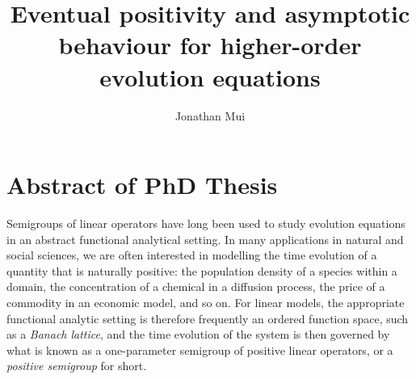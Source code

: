\documentclass{baustms}
\theoremstyle{cupthm}
\theoremstyle{cupdefn}
\theoremstyle{cuprem}
\numberwithin{equation}{section}
\begin{document}
\title{Eventual positivity and asymptotic behaviour for higher-order evolution equations}
\author[1]{Jonathan Mui}
\address[1]{School of Mathematics and Statistics, University of Sydney }






\maketitle

\section{Abstract of PhD Thesis}

Semigroups of linear operators have long been used to study evolution equations in an abstract functional analytical setting. In many applications in natural and social sciences, we are often interested in modelling the time evolution of a quantity that is naturally positive: the population density of a species within a domain, the concentration of a chemical in a diffusion process, the price of a commodity in an economic model, and so on. For linear models, the appropriate functional analytic setting is therefore frequently an ordered function space, such as a \emph{Banach lattice}, and the time evolution of the system is then governed by what is known as a one-parameter semigroup of positive linear operators, or a \emph{positive semigroup} for short.
\end{document}
